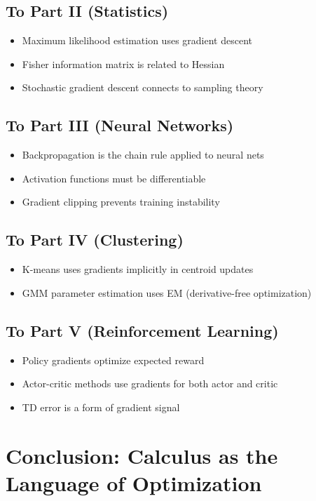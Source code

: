 \subsection{To Part II (Statistics)}
\begin{itemize}
    \item Maximum likelihood estimation uses gradient descent
    \item Fisher information matrix is related to Hessian
    \item Stochastic gradient descent connects to sampling theory
\end{itemize}

\subsection{To Part III (Neural Networks)}
\begin{itemize}
    \item Backpropagation is the chain rule applied to neural nets
    \item Activation functions must be differentiable
    \item Gradient clipping prevents training instability
\end{itemize}

\subsection{To Part IV (Clustering)}
\begin{itemize}
    \item K-means uses gradients implicitly in centroid updates
    \item GMM parameter estimation uses EM (derivative-free optimization)
\end{itemize}

\subsection{To Part V (Reinforcement Learning)}
\begin{itemize}
    \item Policy gradients optimize expected reward
    \item Actor-critic methods use gradients for both actor and critic
    \item TD error is a form of gradient signal
\end{itemize}

\section{Conclusion: Calculus as the Language of Optimization}

